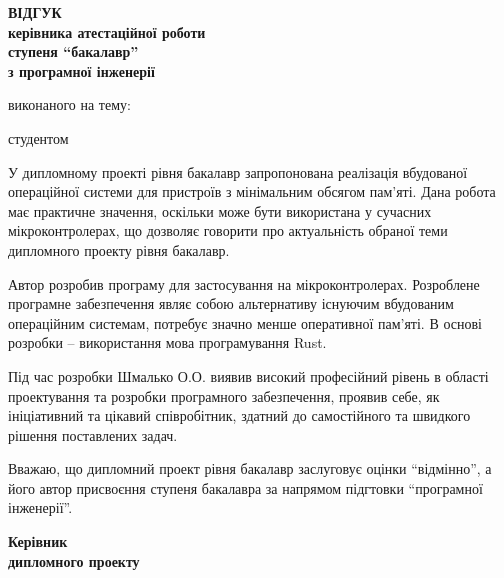 \documentclass[main.tex]{subfiles}
\begin{document}
\begin{otherspecialpage}
  \begin{singlespacing}
  \begin{center}
    \textbf{
      {\large ВІДГУК}\\
      керівника атестаційної роботи\\
      ступеня ``бакалавр''\\
      з програмної інженерії
    }\\
  \end{center}

  \noindent виконаного на тему: 

  \noindent студентом \fillinline{}\\\vspace{5mm}
  \end{singlespacing}


  У дипломному проекті рівня бакалавр запропонована реалізація вбудованої операційної системи для пристроїв з мінімальним обсягом пам'яті. Дана робота має практичне значення, оскільки може бути використана у сучасних мікроконтролерах, що дозволяє говорити про актуальність обраної теми дипломного проекту рівня бакалавр.

  Автор розробив програму для застосування на мікроконтролерах. Розроблене програмне забезпечення являє собою альтернативу існуючим вбудованим операційним системам, потребує значно менше оперативної пам'яті. В основі розробки – використання мова програмування Rust.

  Під час розробки Шмалько О.О. виявив високий професійний рівень в області проектування та розробки програмного забезпечення, проявив себе, як ініціативний та цікавий співробітник, здатний до самостійного та швидкого рішення поставлених задач.

  Вважаю, що дипломний проект рівня бакалавр заслуговує оцінки ``відмінно'', а його автор присвоєння ступеня бакалавра за напрямом підгтовки ``програмної інженерії''.\\

  \vfill

  \noindent
  \textbf{Керівник\\
    дипломного проекту}\\
  \hfill
  \fillin[(підпис)]{\hspace{22mm}}
  \hfill

  \vfill
\end{otherspecialpage}
\end{document}

